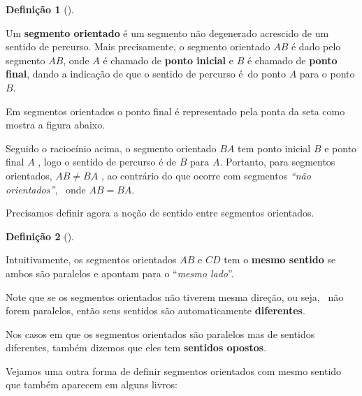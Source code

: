 \documentclass[
  brazilian,
  letterpaper,
  DIV=11,
  numbers=noendperiod]{scrreprt}
\theoremstyle{definition}
\newtheorem{definition}{Definição}[chapter]
\theoremstyle{plain}
\theoremstyle{definition}
\theoremstyle{remark}
\begin{document}
\begin{definition}[]\protect\hypertarget{def-segmento-orientado}{}\label{def-segmento-orientado}

Um \textbf{segmento orientado} é um segmento não degenerado acrescido de
um sentido de percurso. Mais precisamente, o segmento orientado \(AB\) é
dado pelo segmento \(AB\), onde \(A\) é chamado de \textbf{ponto
inicial} e \(B\) é chamado de \textbf{ponto final}, dando a indicação de
que o sentido de percurso é~do ponto \(A\) para o ponto \(B\).

\end{definition}

Em segmentos orientados o ponto final é representado pela ponta da seta
como mostra a figura abaixo.

Seguido o raciocínio acima, o segmento orientado \(BA\) tem ponto
inicial \(B\) e ponto final \(A\) , logo o sentido de percurso é de
\(B\) para \(A\). Portanto, para segmentos orientados, \(AB \neq BA\) ,
ao contrário do que ocorre com segmentos \emph{``não orientados''},~
onde \(AB = BA\).~

Precisamos definir agora a noção de sentido entre segmentos orientados.

\begin{definition}[]\protect\hypertarget{def-sentido-semento}{}\label{def-sentido-semento}

Intuitivamente, os segmentos orientados \(AB\) e \(CD\) tem o
\textbf{mesmo sentido} se ambos são paralelos e apontam para o
``\emph{mesmo lado}''.

Note que se os segmentos orientados não tiverem mesma direção, ou seja,~
não forem paralelos, então seus sentidos são automaticamente
\textbf{diferentes}.

Nos casos em que os segmentos orientados são paralelos mas de sentidos
diferentes, também dizemos que eles tem \textbf{sentidos opostos}.

\end{definition}

Vejamos uma outra forma de definir segmentos orientados com mesmo
sentido que também aparecem em alguns livros:
\end{document}
